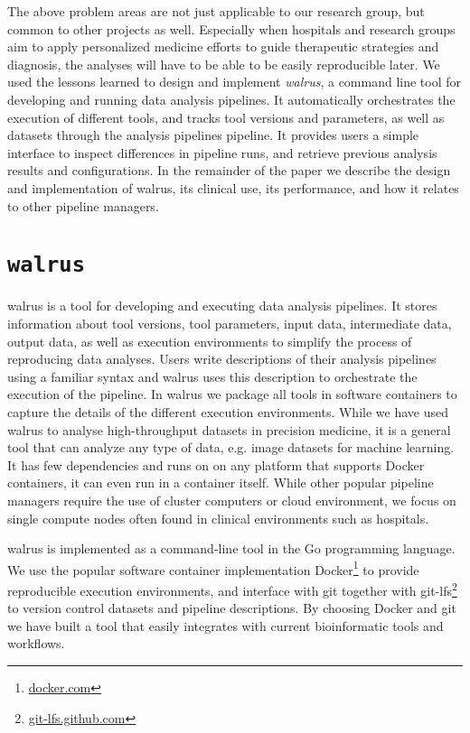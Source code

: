 The above problem areas are not just applicable to our research group, but
common to other projects as well. Especially when hospitals and research groups
aim to apply personalized medicine efforts to guide therapeutic strategies and
diagnosis, the analyses will have to be able to be easily reproducible later. We
used the lessons learned to  design and implement \emph{walrus}, a command line
tool for developing and running data analysis pipelines. It automatically
orchestrates the execution of different tools, and tracks tool versions and
parameters, as well as datasets through the analysis pipelines pipeline. It
provides users a simple interface to inspect differences in pipeline runs, and
retrieve previous analysis results and configurations. In the remainder of the
paper we describe the design and implementation of walrus, its clinical use, its
performance, and how it relates to other pipeline managers. 


\section{\texttt{walrus}} 
walrus is a tool for developing and executing data analysis pipelines. It stores
information about tool versions, tool parameters, input data, intermediate data,
output data, as well as execution environments to simplify the process of
reproducing data analyses. Users write descriptions of their analysis pipelines
using a familiar syntax and walrus uses this description to orchestrate the
execution of the pipeline. In walrus we package all tools in software
containers to capture the details of the different execution environments. While
we have used walrus to analyse high-throughput datasets in precision medicine,
it is a general tool that can analyze any type of data, e.g. image datasets for
machine learning. It has few dependencies and runs on on any platform that
supports Docker containers, it can even run in a container itself.  While other
popular pipeline managers require the use of cluster computers or cloud
environment, we focus on single compute nodes often found in clinical
environments such as hospitals. 

walrus is implemented as a command-line tool in the Go programming language. We
use the popular software container implementation
Docker\footnote{\url{docker.com}} to provide reproducible execution
environments, and interface with git together with
git-lfs\footnote{\url{git-lfs.github.com}} to version control datasets and
pipeline descriptions. By choosing Docker and git we have built a tool that
easily integrates with current bioinformatic tools and workflows. 

